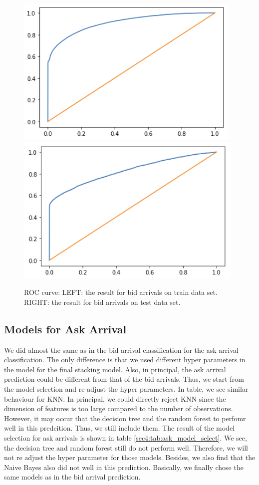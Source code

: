 \documentclass[letterpaper,12pt]{article}
\numberwithin{equation}{section}
\begin{document}
\begin{figure}
    \centering
    \includegraphics[scale=0.45]{figs/ROC_bid_train.png}
    \includegraphics[scale=0.45]{figs/ROC_bid_test.png}
    \caption{\small ROC curve: LEFT: the result for bid arrivals on train data set. RIGHT: the result for bid arrivals on test data set.}
    \label{sec4:fig:ROC_bid}
\end{figure}

\subsection{Models for Ask Arrival}
We did almost the same as in the bid arrival classification for the ask arrival classification. The only difference is that we used different hyper parameters in the model for the final stacking model. Also, in principal, the ask arrival prediction could be different from that of the bid arrivals. Thus, we start from the model selection and re-adjust the hyper parameters. In table, we see similar behaviour for KNN. In principal, we could directly reject KNN since the dimension of features is too large compared to the number of observations. However, it may occur that the decision tree and the random forest to perfomr well in this predcition. Thus, we still include them. The result of the model selection for ask arrivals is shown in table \ref{sec4:tab:ask_model_select}.  We see, the decision tree and random forest still do not perform well. Therefore, we will not re adjust the hyper parameter for those models. Besides, we also find that the Naive Bayes also did not well in this prediction. Basically, we finally chose the same models as in the bid arrival prediction.  
\end{document}

